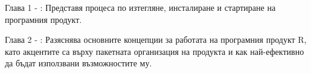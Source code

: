 Глава 1 - : Представя процеса по изтегляне, инсталиране и стартиране на програмния продукт.

Глава 2 - : Разяснява основните концепции за работата на програмния продукт R, като акцентите са върху пакетната организация на продукта и как най-ефективно да бъдат използвани възможностите му.

